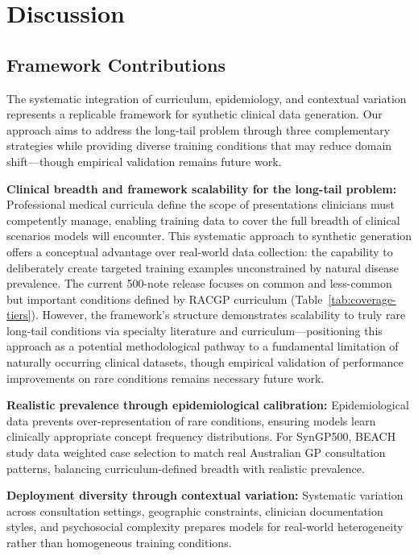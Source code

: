\documentclass[11pt]{article}
\begin{document}
\section{Discussion}

\subsection{Framework Contributions}

The systematic integration of curriculum, epidemiology, and contextual variation represents a replicable framework for synthetic clinical data generation. Our approach aims to address the long-tail problem through three complementary strategies while providing diverse training conditions that may reduce domain shift—though empirical validation remains future work.

\textbf{Clinical breadth and framework scalability for the long-tail problem:} Professional medical curricula define the scope of presentations clinicians must competently manage, enabling training data to cover the full breadth of clinical scenarios models will encounter. This systematic approach to synthetic generation offers a conceptual advantage over real-world data collection: the capability to deliberately create targeted training examples unconstrained by natural disease prevalence. The current 500-note release focuses on common and less-common but important conditions defined by RACGP curriculum (Table~\ref{tab:coverage-tiers}). However, the framework's structure demonstrates scalability to truly rare long-tail conditions via specialty literature and curriculum—positioning this approach as a potential methodological pathway to a fundamental limitation of naturally occurring clinical datasets, though empirical validation of performance improvements on rare conditions remains necessary future work.

\textbf{Realistic prevalence through epidemiological calibration:} Epidemiological data prevents over-representation of rare conditions, ensuring models learn clinically appropriate concept frequency distributions. For SynGP500, BEACH study data weighted case selection to match real Australian GP consultation patterns, balancing curriculum-defined breadth with realistic prevalence.

\textbf{Deployment diversity through contextual variation:} Systematic variation across consultation settings, geographic constraints, clinician documentation styles, and psychosocial complexity prepares models for real-world heterogeneity rather than homogeneous training conditions.
\end{document}
